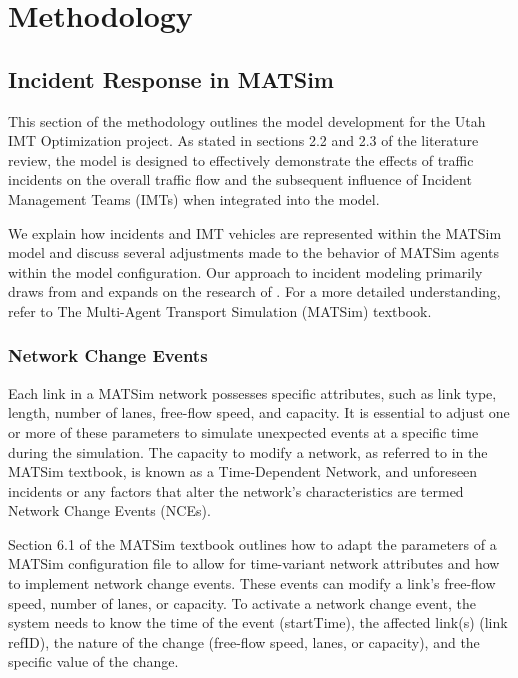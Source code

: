 \documentclass[
  letterpaper,
  authoryear]{elsarticle}
\begin{document}

\hypertarget{methodology}{%
\section{Methodology}\label{methodology}}

\hypertarget{incident-response-in-matsim}{%
\subsection{Incident Response in
MATSim}\label{incident-response-in-matsim}}

This section of the methodology outlines the model development for the
Utah IMT Optimization project. As stated in sections 2.2 and 2.3 of the
literature review, the model is designed to effectively demonstrate the
effects of traffic incidents on the overall traffic flow and the
subsequent influence of Incident Management Teams (IMTs) when integrated
into the model.

We explain how incidents and IMT vehicles are represented within the
MATSim model and discuss several adjustments made to the behavior of
MATSim agents within the model configuration. Our approach to incident
modeling primarily draws from and expands on the research of
\citet{kaddoura2018}. For a more detailed understanding, refer to The
Multi-Agent Transport Simulation (MATSim) textbook.

\hypertarget{network-change-events}{%
\subsubsection{Network Change Events}\label{network-change-events}}

Each link in a MATSim network possesses specific attributes, such as
link type, length, number of lanes, free-flow speed, and capacity. It is
essential to adjust one or more of these parameters to simulate
unexpected events at a specific time during the simulation. The capacity
to modify a network, as referred to in the MATSim textbook, is known as
a Time-Dependent Network, and unforeseen incidents or any factors that
alter the network's characteristics are termed Network Change Events
(NCEs).

Section 6.1 of the MATSim textbook outlines how to adapt the parameters
of a MATSim configuration file to allow for time-variant network
attributes and how to implement network change events. These events can
modify a link's free-flow speed, number of lanes, or capacity. To
activate a network change event, the system needs to know the time of
the event (startTime), the affected link(s) (link refID), the nature of
the change (free-flow speed, lanes, or capacity), and the specific value
of the change.
\end{document}
